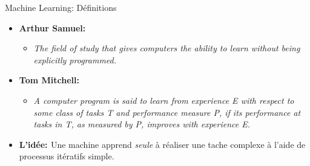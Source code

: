 \documentclass[aspectratio=169, 11pt]{beamer}
\begin{document}
\begin{frame}{Machine Learning: Définitions}
    \begin{itemize}
  \item \textbf{\textcolor{agaetisOrange}{Arthur Samuel:}}
    \begin{itemize}
      \normalsize
    \item \textit{The field of study that gives computers the ability to learn without being explicitly programmed.}
    \end{itemize}
    \vspace{0.2cm}
  \item \textbf{\textcolor{agaetisOrange}{Tom Mitchell:}}
    \begin{itemize}
      \normalsize
    \item \textit{A computer program is said to learn from experience E with respect to some class of tasks T and performance measure P, if its performance at tasks in T, as measured by P, improves with experience E.}
    \end{itemize}
    \vspace{0.5cm}
  \item \textbf{\textcolor{agaetisOrange}{L'idée: }} Une machine apprend \textit{seule} à réaliser une tache complexe à l'aide de processus itératifs simple.
  \end{itemize}
\end{frame}
\end{document}
